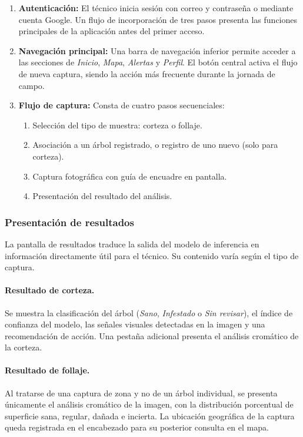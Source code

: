\begin{enumerate}
    \item \textbf{Autenticación:} El técnico inicia sesión con correo y contraseña o mediante cuenta Google. Un flujo de incorporación de tres pasos presenta las funciones principales de la aplicación antes del primer acceso.

    \item \textbf{Navegación principal:} Una barra de navegación inferior permite acceder a las secciones de \textit{Inicio}, \textit{Mapa}, \textit{Alertas} y \textit{Perfil}. El botón central activa el flujo de nueva captura, siendo la acción más frecuente durante la jornada de campo.

    \item \textbf{Flujo de captura:} Consta de cuatro pasos secuenciales:
    \begin{enumerate}
        \item Selección del tipo de muestra: corteza o follaje.
        \item Asociación a un árbol registrado, o registro de uno nuevo (solo para corteza).
        \item Captura fotográfica con guía de encuadre en pantalla.
        \item Presentación del resultado del análisis.
    \end{enumerate}
\end{enumerate}


\subsubsection{Presentación de resultados}

La pantalla de resultados traduce la salida del modelo de inferencia en información directamente útil para el técnico. Su contenido varía según el tipo de captura.

\paragraph{Resultado de corteza.}
Se muestra la clasificación del árbol (\textit{Sano}, \textit{Infestado} o \textit{Sin revisar}), el índice de confianza del modelo, las señales visuales detectadas en la imagen y una recomendación de acción. Una pestaña adicional presenta el análisis cromático de la corteza.

\paragraph{Resultado de follaje.}
Al tratarse de una captura de zona y no de un árbol individual, se presenta únicamente el análisis cromático de la imagen, con la distribución porcentual de superficie sana, regular, dañada e incierta. La ubicación geográfica de la captura queda registrada en el encabezado para su posterior consulta en el mapa.